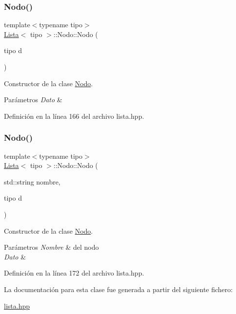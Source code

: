 \subsubsection{\texorpdfstring{Nodo()}{Nodo()}\hspace{0.1cm}{\footnotesize\ttfamily [1/2]}}
{\footnotesize\ttfamily template$<$typename tipo$>$ \\
\hyperlink{classLista}{Lista}$<$ tipo $>$\+::Nodo\+::\+Nodo (\begin{DoxyParamCaption}\item[{tipo}]{d }\end{DoxyParamCaption})\hspace{0.3cm}{\ttfamily [inline]}}



Constructor de la clase \hyperlink{classLista_1_1Nodo}{Nodo}. 


\begin{DoxyParams}{Parámetros}
{\em Dato} & \\
\hline
\end{DoxyParams}


Definición en la línea 166 del archivo lista.\+hpp.

\mbox{\label{classLista_1_1Nodo_a0ab9f1e824afe00a532fabf20ffc2607}} 
\subsubsection{\texorpdfstring{Nodo()}{Nodo()}\hspace{0.1cm}{\footnotesize\ttfamily [2/2]}}
{\footnotesize\ttfamily template$<$typename tipo$>$ \\
\hyperlink{classLista}{Lista}$<$ tipo $>$\+::Nodo\+::\+Nodo (\begin{DoxyParamCaption}\item[{std\+::string}]{nombre,  }\item[{tipo}]{d }\end{DoxyParamCaption})\hspace{0.3cm}{\ttfamily [inline]}}



Constructor de la clase \hyperlink{classLista_1_1Nodo}{Nodo}. 


\begin{DoxyParams}{Parámetros}
{\em Nombre} & del nodo \\
\hline
{\em Dato} & \\
\hline
\end{DoxyParams}


Definición en la línea 172 del archivo lista.\+hpp.



La documentación para esta clase fue generada a partir del siguiente fichero\+:\begin{DoxyCompactItemize}
\item 
\hyperlink{lista_8hpp}{lista.\+hpp}\end{DoxyCompactItemize}
